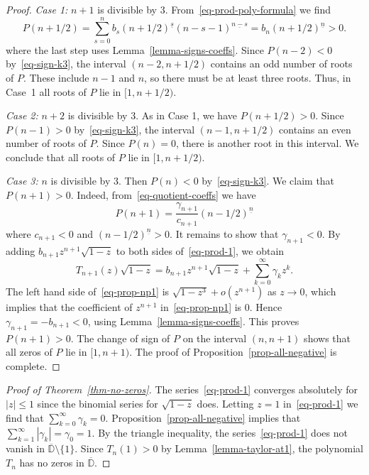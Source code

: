 \documentclass[12pt]{amsart}
\theoremstyle{definition}
\theoremstyle{remark}
\numberwithin{equation}{section}
\begin{document}
\begin{proof}
\textit{Case 1:} $n+1$ is divisible by $3$. From~\eqref{eq-prod-poly-formula} we find
\[
P(n+1/2) = \sum_{s=0}^n b_s (n+1/2)^{\underline{s}}(n-s-1)^{\underline{n-s}}  
=  b_n (n+1/2)^{\underline{n}} > 0.
\]
where the last step uses Lemma~\ref{lemma-signs-coeffs}. Since $P(n-2)<0$ by~\eqref{eq-sign-k3}, the interval $(n-2, n+1/2)$ contains an odd number of roots of $P$. These include $n-1$ and $n$, so there must be at least three roots. Thus, in Case~1 all roots of $P$ lie in $[1, n+1/2)$. 

\textit{Case 2:} $n+2$ is divisible by $3$. As in Case 1, we have $P(n+1/2)>0$. Since $P(n-1)>0$ by~\eqref{eq-sign-k3}, the interval $(n-1, n+1/2)$ contains an even number of roots of $P$. Since $P(n) = 0$, there is another root in this interval. We conclude that all roots of $P$ lie in $[1, n+1/2)$. 

\textit{Case 3:} $n$ is divisible by $3$. Then $P(n)<0$ by~\eqref{eq-sign-k3}. We claim that $P(n+1)>0$.
Indeed, from~\eqref{eq-quotient-coeffs} we have
\[
P(n+1) = \frac{\gamma_{n+1}}{c_{n+1}}(n-1/2)^{\underline{n}}
\]
where $c_{n+1}<0$ and $(n-1/2)^{\underline{n}} > 0$. It remains to show that $\gamma_{n+1}<0$. By adding $b_{n+1}z^{n+1}\sqrt{1-z}$ to both sides of~\eqref{eq-prod-1}, we obtain 
\begin{equation}\label{eq-prop-np1}
T_{n+1}(z)\sqrt{1-z} = b_{n+1}z^{n+1}\sqrt{1-z}
+ \sum_{k=0}^\infty \gamma_k z^k. 
\end{equation}
The left hand side of~\eqref{eq-prop-np1} is
$\sqrt{1-z^3} + o(z^{n+1})$ as $z\to 0$, which implies that the coefficient of $z^{n+1}$ in~\eqref{eq-prop-np1} is $0$. Hence
$\gamma_{n+1} = - b_{n+1} < 0$, using Lemma~\ref{lemma-signs-coeffs}. This proves $P(n+1)>0$. The change of sign of $P$ on the interval $(n, n+1)$ shows that all zeros of $P$ lie  in $[1, n+1)$. The proof of Proposition~\ref{prop-all-negative} is complete.    
\end{proof}



\begin{proof}[Proof of Theorem~\ref{thm-no-zeros}] The series~\eqref{eq-prod-1} converges absolutely for $|z|\le 1$ since the binomial series for $\sqrt{1-z}$ does. Letting $z=1$ in~\eqref{eq-prod-1} we find that 
$\sum_{k=0}^\infty \gamma_k = 0$. Proposition~\ref{prop-all-negative} implies  that  
$\sum_{k=1}^\infty |\gamma_k| = \gamma_0 = 1$. By the triangle inequality, the series~\eqref{eq-prod-1} does not vanish in $\overline{\mathbb D}\setminus \{1\}$. Since $T_n(1)>0$ by Lemma~\ref{lemma-taylor-at1}, the polynomial $T_n$ has no zeros in $\overline{\mathbb D}$.     
\end{proof}
\end{document}
